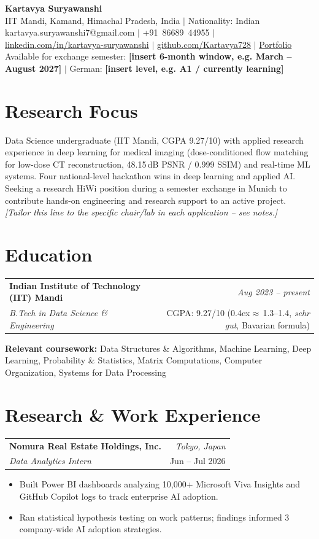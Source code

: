 \documentclass[a4paper,10pt]{article}
\makeatletter
\newcommand{\resumeItem}[1]{\item\small #1}
\newcommand{\tightlist}{\begin{itemize}[leftmargin=1.05em,itemsep=0pt,topsep=1pt,parsep=0pt,partopsep=0pt]}
\newcommand{\tightlistend}{\end{itemize}}
\newcommand{\entry}[4]{%
  \begin{tabularx}{\linewidth}{@{}X@{\hspace{4pt}}r@{}}
    \textbf{#1} & {\small\itshape\color{gray}#3}\\
    \textit{\small #2} & {\small\color{gray}#4}
  \end{tabularx}\vspace{2pt}
}
\makeatother
\begin{document}
\begin{center}
{\LARGE \textbf{Kartavya Suryawanshi}}\\[3pt]
\small
IIT Mandi, Kamand, Himachal Pradesh, India \quad $\vert$ \quad Nationality: Indian\\[1pt]
kartavya.suryawanshi7@gmail.com \quad $\vert$ \quad +91~86689~44955 \quad $\vert$ \quad
\href{https://www.linkedin.com/in/kartavya-suryawanshi-918753320/}{linkedin.com/in/kartavya-suryawanshi} \quad $\vert$ \quad
\href{https://github.com/Kartavya728}{github.com/Kartavya728} \quad $\vert$ \quad
\href{https://kartavyasuryawanshi.vercel.app/}{Portfolio}\\[1pt]
{\color{gray} Available for exchange semester: \textbf{[insert 6-month window, e.g. March -- August 2027]} \quad $\vert$ \quad German: \textbf{[insert level, e.g. A1 / currently learning]}}
\end{center}
\vspace{2pt}

\section{Research Focus}
\small
Data Science undergraduate (IIT Mandi, CGPA 9.27/10) with applied research experience in deep learning for medical imaging (dose-conditioned flow matching for low-dose CT reconstruction, 48.15\,dB PSNR / 0.999 SSIM) and real-time ML systems. Four national-level hackathon wins in deep learning and applied AI. Seeking a research HiWi position during a semester exchange in Munich to contribute hands-on engineering and research support to an active project. \textit{[Tailor this line to the specific chair/lab in each application -- see notes.]}

\section{Education}
\entry{Indian Institute of Technology (IIT) Mandi}{B.Tech in Data Science \& Engineering}{Aug 2023 -- present}{CGPA: 9.27/10 (\raise0.4ex\hbox{\tiny$\approx$}\,1.3--1.4, \textit{sehr gut}, Bavarian formula)}
\small\textbf{Relevant coursework:} Data Structures \& Algorithms, Machine Learning, Deep Learning, Probability \& Statistics, Matrix Computations, Computer Organization, Systems for Data Processing

\section{Research \& Work Experience}
\entry{Nomura Real Estate Holdings, Inc.}{Data Analytics Intern}{Tokyo, Japan}{Jun -- Jul 2026}
\vspace{-4pt}
\tightlist
\resumeItem{Built Power BI dashboards analyzing 10,000+ Microsoft Viva Insights and GitHub Copilot logs to track enterprise AI adoption.}
\resumeItem{Ran statistical hypothesis testing on work patterns; findings informed 3 company-wide AI adoption strategies.}
\tightlistend
\end{document}
